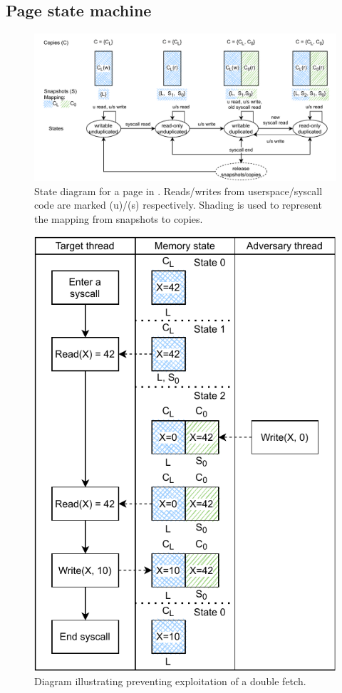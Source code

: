 \documentclass[letterpaper,twocolumn,10pt, anonymous]{article}
\begin{document}
\subsection{Page state machine}

\begin{figure}[]
  \includegraphics[width=\linewidth]{img/tiktok_states.pdf}
  \caption{State diagram for a page in \tiktok. Reads/writes from userspace/syscall 
          code are marked (u)/(s) respectively. Shading is used to represent the 
          mapping from snapshots to copies.}
  \label{fig:tiktok_states}
\end{figure}

\begin{figure}[]
  \includegraphics[width=\linewidth]{img/doublefetch_tiktok.pdf}
  \caption{Diagram illustrating \tiktok preventing exploitation of a double fetch.}
  \label{fig:doublefetch_tiktok}
\end{figure}
\end{document}
